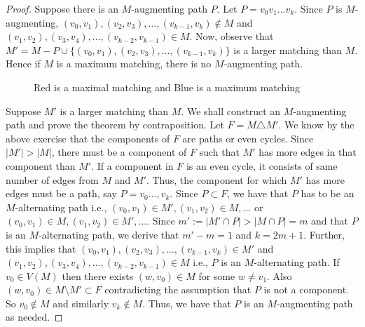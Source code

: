 \documentclass[../basic_graph_theory.tex]{subfiles}
\begin{document}
\begin{proof}
    Suppose there is an $M$-augmenting path $P$. Let $P = v_0v_1\ldots v_k$. Since $P$ is $M$-augmenting, $(v_0,v_1),(v_2,v_3),\ldots,(v_{k-1},v_k) \notin M$ and $(v_1,v_2), (v_3,v_4),\ldots,(v_{k-2},v_{k-1}) \in M$.  Now, observe that $M' = M - P \cup \{ (v_0,v_1),(v_2,v_3),\ldots,(v_{k-1},v_k) \}$ is a larger matching than $M$. Hence if $M$ is a maximum matching, there is no $M$-augmenting path. 
    \begin{figure}[htbp]
        \centering
        \caption{Red is a maximal matching and Blue is a maximum matching}
        \label{fig:matching paths}
    \end{figure}
     Suppose $M'$ is a larger matching than $M$. We shall construct an $M$-augmenting path and prove the theorem by contraposition. Let $F = M \triangle M'$. We know by the above exercise that the components of $F$ are paths or even cycles. Since $|M'| > |M|$, there must be a component of $F$ such that $M'$ has more edges in that component than $M'$. If a component in $F$ is an even cycle, it consists of same number of edges from $M$ and $M'$. Thus, the component for which $M'$ has more edges must be a path, say $P = v_0\ldots,v_k$. Since $P \subset F$, we have that $P$ has to be an $M$-alternating path i.e., $(v_0,v_1) \in M', (v_1,v_2) \in M, \ldots$ or $(v_0,v_1) \in M, (v_1,v_2) \in M', \ldots$. Since $m' := |M' \cap P| > |M \cap P| = m$ and that $P$ is an $M$-alternating path,  we derive that $m' - m = 1$ and $k = 2m + 1$.  Further, this implies that $(v_0,v_1),(v_2,v_3),\ldots,(v_{k-1},v_k) \in M'$ and $(v_1,v_2), (v_3,v_4),\ldots,(v_{k-2},v_{k-1}) \in M$ i.e.,  $P$ is an $M$-alternating path.   If $v_0 \in V(M)$ then there exists $(w,v_0) \in M$ for some $w \neq v_1$.  Also $(w,v_0) \in M \setminus M' \subset F$ contradicting the assumption that $P$ is not a component.   So $v_0 \notin M$ and similarly $v_k \notin M$.   Thus,  we have that $P$ is an $M$-augmenting path as needed.  
\end{proof}
\end{document}
